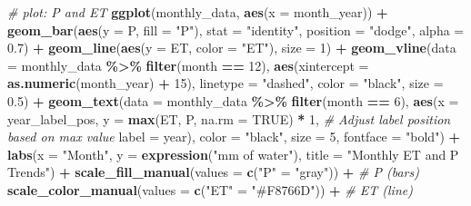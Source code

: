 \documentclass[
]{article}
\newenvironment{Shaded}{\begin{snugshade}}{\end{snugshade}}
\newcommand{\AttributeTok}[1]{\textcolor[rgb]{0.13,0.29,0.53}{#1}}
\newcommand{\CommentTok}[1]{\textcolor[rgb]{0.56,0.35,0.01}{\textit{#1}}}
\newcommand{\ConstantTok}[1]{\textcolor[rgb]{0.56,0.35,0.01}{#1}}
\newcommand{\DecValTok}[1]{\textcolor[rgb]{0.00,0.00,0.81}{#1}}
\newcommand{\FloatTok}[1]{\textcolor[rgb]{0.00,0.00,0.81}{#1}}
\newcommand{\FunctionTok}[1]{\textcolor[rgb]{0.13,0.29,0.53}{\textbf{#1}}}
\newcommand{\NormalTok}[1]{#1}
\newcommand{\OtherTok}[1]{\textcolor[rgb]{0.56,0.35,0.01}{#1}}
\newcommand{\SpecialCharTok}[1]{\textcolor[rgb]{0.81,0.36,0.00}{\textbf{#1}}}
\newcommand{\StringTok}[1]{\textcolor[rgb]{0.31,0.60,0.02}{#1}}
\begin{document}
\begin{Shaded}
\begin{Highlighting}[]
\CommentTok{\# plot: P and ET}
\FunctionTok{ggplot}\NormalTok{(monthly\_data, }\FunctionTok{aes}\NormalTok{(}\AttributeTok{x =}\NormalTok{ month\_year)) }\SpecialCharTok{+}
  \FunctionTok{geom\_bar}\NormalTok{(}\FunctionTok{aes}\NormalTok{(}\AttributeTok{y =}\NormalTok{ P, }\AttributeTok{fill =} \StringTok{"P"}\NormalTok{), }\AttributeTok{stat =} \StringTok{"identity"}\NormalTok{, }\AttributeTok{position =} \StringTok{"dodge"}\NormalTok{, }\AttributeTok{alpha =} \FloatTok{0.7}\NormalTok{) }\SpecialCharTok{+}
  \FunctionTok{geom\_line}\NormalTok{(}\FunctionTok{aes}\NormalTok{(}\AttributeTok{y =}\NormalTok{ ET, }\AttributeTok{color =} \StringTok{"ET"}\NormalTok{), }\AttributeTok{size =} \DecValTok{1}\NormalTok{) }\SpecialCharTok{+}
  \FunctionTok{geom\_vline}\NormalTok{(}\AttributeTok{data =}\NormalTok{ monthly\_data }\SpecialCharTok{\%\textgreater{}\%} \FunctionTok{filter}\NormalTok{(month }\SpecialCharTok{==} \DecValTok{12}\NormalTok{), }
             \FunctionTok{aes}\NormalTok{(}\AttributeTok{xintercept =} \FunctionTok{as.numeric}\NormalTok{(month\_year) }\SpecialCharTok{+} \DecValTok{15}\NormalTok{), }
             \AttributeTok{linetype =} \StringTok{"dashed"}\NormalTok{, }\AttributeTok{color =} \StringTok{"black"}\NormalTok{, }\AttributeTok{size =} \FloatTok{0.5}\NormalTok{) }\SpecialCharTok{+}
  \FunctionTok{geom\_text}\NormalTok{(}\AttributeTok{data =}\NormalTok{ monthly\_data }\SpecialCharTok{\%\textgreater{}\%} \FunctionTok{filter}\NormalTok{(month }\SpecialCharTok{==} \DecValTok{6}\NormalTok{), }
            \FunctionTok{aes}\NormalTok{(}\AttributeTok{x =}\NormalTok{ year\_label\_pos, }
                \AttributeTok{y =} \FunctionTok{max}\NormalTok{(ET, P, }\AttributeTok{na.rm =} \ConstantTok{TRUE}\NormalTok{) }\SpecialCharTok{*} \DecValTok{1}\NormalTok{,  }\CommentTok{\# Adjust label position based on max value}
                \AttributeTok{label =}\NormalTok{ year), }
            \AttributeTok{color =} \StringTok{"black"}\NormalTok{, }\AttributeTok{size =} \DecValTok{5}\NormalTok{, }\AttributeTok{fontface =} \StringTok{"bold"}\NormalTok{) }\SpecialCharTok{+}
  \FunctionTok{labs}\NormalTok{(}\AttributeTok{x =} \StringTok{"Month"}\NormalTok{, }\AttributeTok{y =} \FunctionTok{expression}\NormalTok{(}\StringTok{"mm of water"}\NormalTok{), }\AttributeTok{title =} \StringTok{"Monthly ET and P Trends"}\NormalTok{) }\SpecialCharTok{+}
  \FunctionTok{scale\_fill\_manual}\NormalTok{(}\AttributeTok{values =} \FunctionTok{c}\NormalTok{(}\StringTok{"P"} \OtherTok{=} \StringTok{"gray"}\NormalTok{)) }\SpecialCharTok{+}  \CommentTok{\# P (bars)}
  \FunctionTok{scale\_color\_manual}\NormalTok{(}\AttributeTok{values =} \FunctionTok{c}\NormalTok{(}\StringTok{"ET"} \OtherTok{=} \StringTok{"\#F8766D"}\NormalTok{)) }\SpecialCharTok{+}  \CommentTok{\# ET (line)}

\end{Highlighting}
\end{Shaded}
\end{document}
